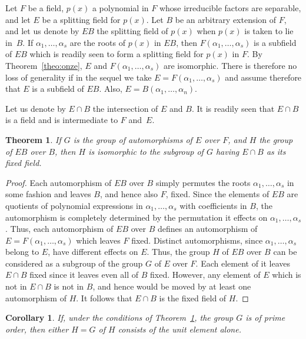 \documentclass[10pt,leqno,a5paper]{book}
\newtheorem{theo}{Theorem}
\newtheorem*{coro*}{Corollary}
\theoremstyle{definition}
\begin{document}
Let $F$ be a field, $p(x)$ a polynomial in $F$ whose irreducible factors are separable, and let $E$ be a splitting field for $p(x)$.
Let $B$ be an arbitrary extension of $F$, and let us denote by $EB$ the splitting field of $p(x)$ when $p(x)$ is taken to lie in~$B$.
If $\alpha_1, \ldots, \alpha_s$ are the roots of $p(x)$ in $EB$, then $F(\alpha_1, \ldots, \alpha_s)$ is a subfield of $EB$ which is readily seen to form a splitting field for $p(x)$ in $F$.
By Theorem~\ref{theo:onze}, $E$ and $F(\alpha_1,\ldots,\alpha_s)$ are isomorphic.
There is therefore no loss of generality if in the sequel we take $E = F(\alpha_1,\ldots,\alpha_s)$ and assume therefore that $E$ is a subfield of $EB$.
Also, $E = B(\alpha_1, \ldots, \alpha_n)$.

Let us denote by $E \cap B$ the intersection of $E$ and $B$.
It is readily seen that $E \cap B$ is a field and is intermediate to $F$ and~$E$.%


\begin{theo}
\label{theo:29}
If $G$ is the group of automorphisms of $E$ over $F$, and $H$ the group of $EB$ over $B$, then $H$ is isomorphic to the subgroup of $G$ having $E \cap B$ as its fixed field.
\end{theo}


\begin{proof}
Each automorphism of $EB$ over $B$ simply permutes the roots $\alpha_1, \ldots, \alpha_s$ in some fashion and leaves $B$, and hence also $F$, fixed.
Since the elements of $EB$ are quotients of polynomial expressions in $\alpha_1, \ldots, \alpha_s$ with coefficients in $B$, the automorphism is completely determined by the permutation it effects on $\alpha_1, \ldots, \alpha_s$.
Thus, each automorphism of $EB$ over $B$ defines an automorphism of $E = F(\alpha_1,\ldots,\alpha_s)$ which leaves $F$ fixed.
Distinct automorphisms, since $\alpha_1, \ldots, \alpha_s$ belong to $E$, have different effects on $E$.
Thus, the group $H$ of $EB$ over $B$ can be considered as a subgroup of the group $G$ of $E$ over $F$.
Each element of it leaves $E \cap B$ fixed since it leaves even all of $B$ fixed.
However, any element of $E$ which is not in $E \cap B$ is not in $B$, and hence would be moved by at least one automorphism of $H$.
It follows that $E \cap B$ is the fixed field of $H$.
\end{proof}


\begin{coro*}
If, under the conditions of Theorem~\ref{theo:29}, the group $G$ is of prime order, then either $H = G$ of $H$ consists of the unit element alone.
\end{coro*}
\end{document}

